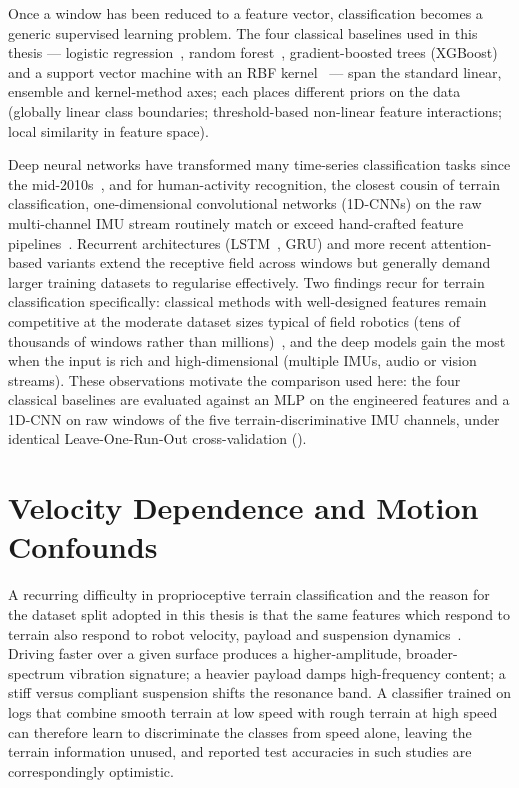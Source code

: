 Once a window has been reduced to a feature vector, classification becomes a generic supervised learning problem. The four classical baselines used in this thesis --- logistic regression~\cite{Hosmer2013}, random forest~\cite{Breiman2001}, gradient-boosted trees (XGBoost)~\cite{Chen2016} and a support vector machine with an RBF kernel~\cite{Cortes1995} --- span the standard linear, ensemble and kernel-method axes; each places different priors on the data (globally linear class boundaries; threshold-based non-linear feature interactions; local similarity in feature space).

Deep neural networks have transformed many time-series classification tasks since the mid-2010s~\cite{LeCun2015,Fawaz2019}, and for human-activity recognition, the closest cousin of terrain classification, one-dimensional convolutional networks (1D-CNNs) on the raw multi-channel IMU stream routinely match or exceed hand-crafted feature pipelines~\cite{Wang2017,Fawaz2019}. Recurrent architectures (LSTM~\cite{Hochreiter1997}, GRU) and more recent attention-based variants extend the receptive field across windows but generally demand larger training datasets to regularise effectively. Two findings recur for terrain classification specifically: classical methods with well-designed features remain competitive at the moderate dataset sizes typical of field robotics (tens of thousands of windows rather than millions)~\cite{Weiss2011,Otsu2016,Fawaz2019}, and the deep models gain the most when the input is rich and high-dimensional (multiple IMUs, audio or vision streams). These observations motivate the comparison used here: the four classical baselines are evaluated against an MLP on the engineered features and a 1D-CNN on raw windows of the five terrain-discriminative IMU channels, under identical Leave-One-Run-Out cross-validation ().

\section{Velocity Dependence and Motion Confounds}
\label{sec:bg-vel}

A recurring difficulty in proprioceptive terrain classification and the reason for the dataset split adopted in this thesis is that the same features which respond to terrain also respond to robot velocity, payload and suspension dynamics~\cite{Bermudez2012,Coyle2008}. Driving faster over a given surface produces a higher-amplitude, broader-spectrum vibration signature; a heavier payload damps high-frequency content; a stiff versus compliant suspension shifts the resonance band. A classifier trained on logs that combine smooth terrain at low speed with rough terrain at high speed can therefore learn to discriminate the classes from speed alone, leaving the terrain information unused, and reported test accuracies in such studies are correspondingly optimistic.

